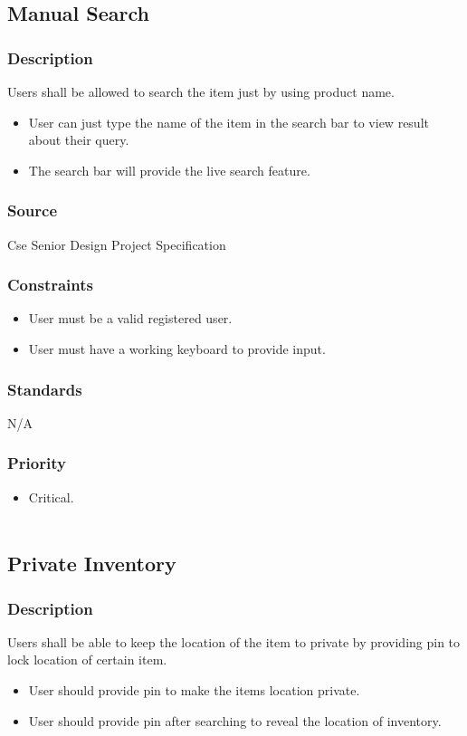 \subsection{Manual Search}
\subsubsection{Description}
Users shall be allowed to search the item just by using product name.
\begin{itemize}
\item User can just type the name of the item in the search bar to view result about their query.
\item The search bar will provide the live search feature.
\end{itemize}
\subsubsection{Source}
Cse Senior Design Project Specification 
\subsubsection{Constraints}
\begin{itemize}
\item User must be a valid registered user.
\item User must have a working keyboard to provide input.
\end{itemize}
\subsubsection{Standards}
N/A
\subsubsection{Priority}
\begin{itemize}
\item Critical.\\ \\
\end{itemize}

\subsection{Private Inventory}
\subsubsection{Description}
Users shall be able to keep the location of the item to private  by providing pin to lock location of certain item. 
\begin{itemize}
\item User should provide pin to make the items location private.
\item User should provide pin after searching to reveal the location of inventory.
\end{itemize}
